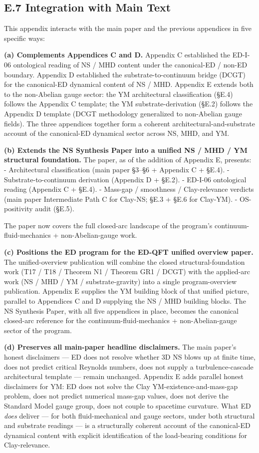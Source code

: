 \documentclass[
]{article}
\begin{document}
\subsection{E.7 Integration with Main
Text}\label{e.7-integration-with-main-text}

This appendix interacts with the main paper and the previous appendices
in five specific ways:

\textbf{(a) Complements Appendices C and D.} Appendix C established the
ED-I-06 ontological reading of NS / MHD content under the canonical-ED /
non-ED boundary. Appendix D established the substrate-to-continuum
bridge (DCGT) for the canonical-ED dynamical content of NS / MHD.
Appendix E extends both to the non-Abelian gauge sector: the YM
architectural classification (§E.4) follows the Appendix C template; the
YM substrate-derivation (§E.2) follows the Appendix D template (DCGT
methodology generalized to non-Abelian gauge fields). The three
appendices together form a coherent architectural-and-substrate account
of the canonical-ED dynamical sector across NS, MHD, and YM.

\textbf{(b) Extends the NS Synthesis Paper into a unified NS / MHD / YM
structural foundation.} The paper, as of the addition of Appendix E,
presents: - Architectural classification (main paper §3--§6 + Appendix C
+ §E.4). - Substrate-to-continuum derivation (Appendix D + §E.2). -
ED-I-06 ontological reading (Appendix C + §E.4). - Mass-gap / smoothness
/ Clay-relevance verdicts (main paper Intermediate Path C for Clay-NS;
§E.3 + §E.6 for Clay-YM). - OS-positivity audit (§E.5).

The paper now covers the full closed-arc landscape of the program's
continuum-fluid-mechanics + non-Abelian-gauge work.

\textbf{(c) Positions the ED program for the ED-QFT unified overview
paper.} The unified-overview publication will combine the closed
structural-foundation work (T17 / T18 / Theorem N1 / Theorem GR1 / DCGT)
with the applied-arc work (NS / MHD / YM / substrate-gravity) into a
single program-overview publication. Appendix E supplies the YM building
block of that unified picture, parallel to Appendices C and D supplying
the NS / MHD building blocks. The NS Synthesis Paper, with all five
appendices in place, becomes the canonical closed-arc reference for the
continuum-fluid-mechanics + non-Abelian-gauge sector of the program.

\textbf{(d) Preserves all main-paper headline disclaimers.} The main
paper's honest disclaimers --- ED does not resolve whether 3D NS blows
up at finite time, does not predict critical Reynolds numbers, does not
supply a turbulence-cascade architectural template --- remain unchanged.
Appendix E adds parallel honest disclaimers for YM: ED does not solve
the Clay YM-existence-and-mass-gap problem, does not predict numerical
mass-gap values, does not derive the Standard Model gauge group, does
not couple to spacetime curvature. What ED \emph{does} deliver --- for
both fluid-mechanical and gauge sectors, under both structural and
substrate readings --- is a structurally coherent account of the
canonical-ED dynamical content with explicit identification of the
load-bearing conditions for Clay-relevance.
\end{document}
